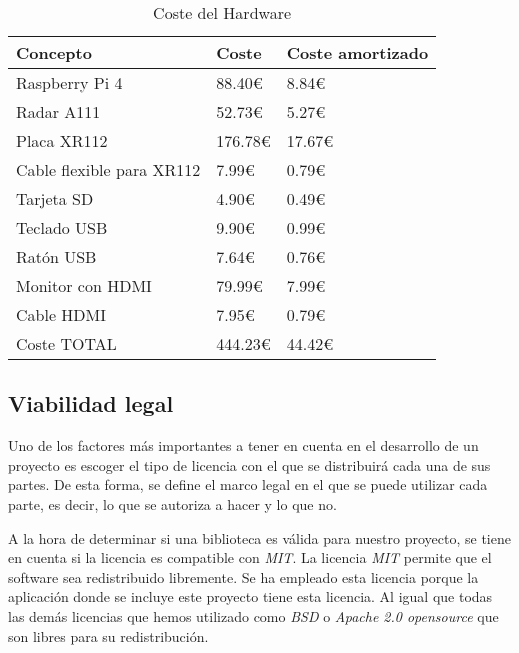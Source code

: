\begin{table}[H]
	\centering
	\begin{tabular}{l|l|l}
		\toprule
		Concepto & Coste & Coste amortizado  \\
		\midrule
		Raspberry Pi 4  & 88.40€ & 8.84€ \\
  		Radar A111 & 52.73€ & 5.27€\\
  		Placa XR112 & 176.78€ & 17.67€\\
  		Cable flexible para XR112  & 7.99€ & 0.79€\\
  		Tarjeta SD  & 4.90€ & 0.49€\\
  		Teclado USB & 9.90€ & 0.99€\\
  		Ratón USB & 7.64€ & 0.76€\\
  		Monitor con HDMI & 79.99€ & 7.99€\\
  		Cable HDMI & 7.95€  & 0.79€\\
		\bottomrule
		Coste TOTAL & 444.23€ & 44.42€\\
	\end{tabular}
	\caption{Coste del Hardware}
	\label{tab:material}
\end{table}
 
\subsection{Viabilidad legal}

Uno de los factores más importantes a tener en cuenta en el desarrollo de un proyecto es escoger el tipo de licencia con el que se distribuirá cada una de sus partes. De esta forma, se define el marco legal en el que se puede utilizar cada parte, es decir, lo que se autoriza a hacer y lo que no.

A la hora de determinar si una biblioteca es válida para nuestro proyecto, se tiene en cuenta si la licencia es compatible con \textit{MIT}. La licencia \textit{MIT} permite que el software sea redistribuido libremente. Se ha empleado esta licencia porque la aplicación donde se incluye este proyecto tiene esta licencia. Al igual que todas las demás licencias que hemos utilizado como \textit{BSD} o \textit{Apache 2.0 opensource} que son libres para su redistribución.

